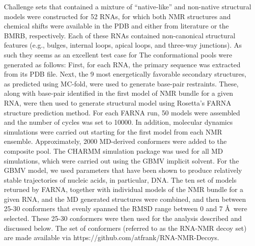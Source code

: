 \documentclass[journal=jcisd8,manuscript=article,layout=onecolumn]{achemso}
\begin{document}
Challenge sets that contained a mixture of ``native-like'' and non-native structural models were constructed for 52 RNAs, for which both NMR structures and chemical shifts were available in the PDB\cite{bernstein1977protein}  and either from literature or the BMRB\cite{ulrich2008biomagresbank}, respectively. Each of these RNAs contained non-canonical structural features (e.g., bulges, internal loops, apical loops, and three-way junctions). As such they seems as an excellent test case for The conformational pools were generated as follows: First, for each RNA, the primary sequence was extracted from its PDB file. Next, the 9 most energetically favorable secondary structures, as predicted using MC-fold\cite{parisien2008mc}, were used to generate base-pair restraints. These, along with base-pair identified in the first model of NMR bundle for a given RNA, were then used to generate structural model using Rosetta's FARNA structure prediction method\cite{das2010atomic}. For each FARNA run, 50 models were assembled and the number of cycles was set to 10000.  In addition, molecular dynamics simulations were carried out starting for the first model from each NMR ensemble. Approximately, 2000 MD-derived conformers were added to the composite pool. The CHARMM simulation package\cite{brooks1983charmm} was used for all MD simulations, which were carried out using the GBMV implicit solvent\cite{lee2002novel, lee2003new}. For the GBMV model, we used parameters that have been shown to produce relatively stable trajectories of nucleic acids, in particular, DNA\cite{chocholouvsova2006implicit}. The ten set of models returned by FARNA, together with individual models of the NMR bundle for a given RNA, and the MD generated structures were combined, and then between 25-30 conformers that evenly spanned the RMSD range between 0 and 7 \AA\  were selected. These 25-30 conformers were then used for the analysis described and discussed below. The set of conformers (referred to as the RNA-NMR decoy set) are made available via https://github.com/atfrank/RNA-NMR-Decoys.
\end{document}
